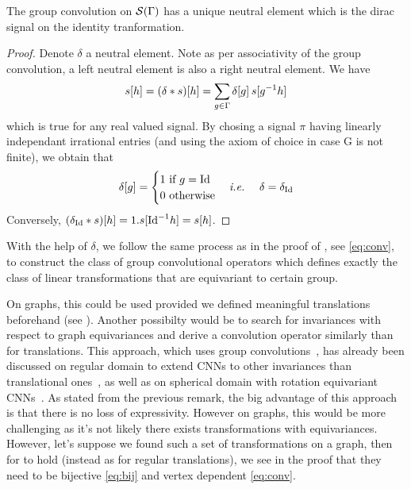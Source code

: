 
\begin{proposition} The group convolution on $\cs(\Gamma)$ has a unique neutral element which is the dirac signal on the identity tranformation.
\end{proposition}
\begin{proof}
Denote $\delta$ a neutral element. Note as per associativity of the group convolution, a left neutral element is also a right neutral element. We have $$s[h] = (\delta \ast s)[h] = \displaystyle \sum_{g \in \Gamma} \delta[g] \h{2} s[g^{-1}h]$$ which is true for any real valued signal. By chosing a signal $\pi$ having linearly independant irrational entries (and using the axiom of choice in case G is not finite), we obtain that $$\delta[g] = \begin{cases} 1 \text{ if } g = \id\\ 0 \text{ otherwise}\end{cases} \ie \quad \delta = \delta_{\id}$$
Conversely, $(\delta_{\id} \ast s)[h] = 1 . s[{\id}^{-1}h] = s[h]$.
\end{proof}

With the help of $\delta$, we follow the same process as in the proof of , see \eqref{eq:conv}, to construct the class of group convolutional operators which defines exactly the class of linear transformations that are equivariant to certain group.













On graphs, this could be used provided we defined meaningful translations beforehand (see \secref{}). Another possibilty would be to search for invariances with respect to graph equivariances and derive a convolution operator similarly than for translations. This approach, which uses group convolutions~\citep{weinstein1996groupoids}, has already been discussed on regular domain to extend CNNs to other invariances than translational ones~\citep{cohen2016group,hoogeboom2018hexaconv}, as well as on spherical domain with rotation equivariant CNNs~\citep{cohen2018spherical}. As stated from the previous remark, the big advantage of this approach is that there is no loss of expressivity. However on graphs, this would be more challenging as it's not likely there exists transformations with equivariances. However, let's suppose we found such a set of transformations on a graph, then for  to hold (instead as for regular translations), we see in the proof that they need to be bijective \eqref{eq:bij} and vertex dependent \ref{eq:conv}.




